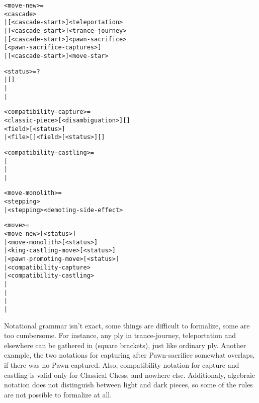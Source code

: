 \clearpage %

\begin{alltt}
<move-new> =
  <cascade>
| [<cascade-start>\alg{~}]<teleportation>
| [<cascade-start>\alg{~}]<trance-journey>
| [<cascade-start>\alg{~}]<pawn-sacrifice>
    [<pawn-sacrifice-captures>]
| [<cascade-start>\alg{~}]<move-star>

<status> = ?
         | \alg{+}[\alg{(=)}]
         | \alg{#}
         | \alg{(=)}

<compatibility-capture> =
  <classic-piece>[<disambiguation>][]
    <field>[<status>]
| <file>[]<field>[<status>][]

<compatibility-castling> =
| 
| 
| 

<move-monolith> =
  <stepping>
| <stepping><demoting-side-effect>
\end{alltt}

\clearpage %

\begin{alltt}
<move> =
  <move-new>[<status>]
| <move-monolith>[<status>]
| <king-castling-move>[<status>]
| <pawn-promoting-move>[<status>]
| <compatibility-capture>
| <compatibility-castling>
| \alg{#}
| \alg{##}
| \alg{(==)}
| \alg{(===)}
\end{alltt}


Notational grammar isn't exact, some things are difficult to formalize, some are
too cumbersome. For instance, any ply in trance-journey, teleportation and
elsewhere can be gathered in \alg{[ ]} (square brackets), just like ordinary ply.
Another example, the two notations for capturing after Pawn-sacrifice somewhat
overlaps, if there was no Pawn captured. Also, compatibility notation for capture
and castling is valid only for Classical Chess, and nowhere else. Additionaly,
algebraic notation does not distinguish between light and dark pieces, so some
of the rules are not possible to formalize at all.

\clearpage %
